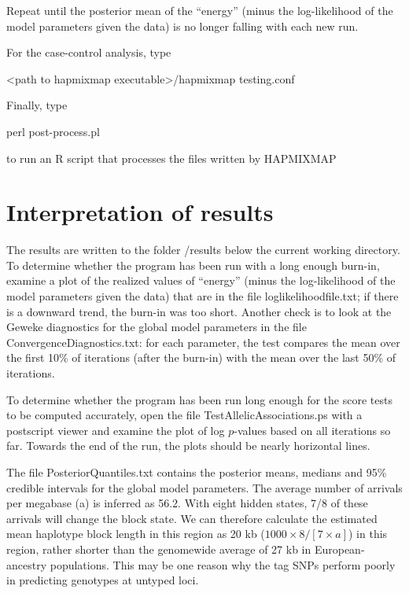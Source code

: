 \documentclass[preprint, a4paper]{aastex}
\begin{document}
Repeat  until  the  posterior   mean  of  the  ``energy''  (minus  the
log-likelihood of the model parameters given the data) is no longer falling
with each new run.  

For the case-control analysis, type 

<path to hapmixmap executable>/hapmixmap testing.conf

Finally, type 

perl post-process.pl

to run an R script that processes the files written by HAPMIXMAP


\section{Interpretation of results}
The results are written to the folder /results below the current
working directory.  To determine whether the program has been run with
a long enough burn-in, examine a plot of the realized values of
``energy'' (minus the log-likelihood of the model parameters given the
data) that are in the file loglikelihoodfile.txt; if there is a
downward trend, the burn-in was too short.  Another check is to look
at the Geweke diagnostics for the global model parameters in the file
ConvergenceDiagnostics.txt: for each parameter, the test compares the
mean over the first 10\% of iterations (after the burn-in) with the
mean over the last 50\% of iterations.

To determine whether the program has been run long enough for the
score tests to be computed accurately, open the file
TestAllelicAssociations.ps with a postscript viewer and examine the
plot of log $p$-values based on all iterations so far.  Towards the
end of the run, the plots should be nearly horizontal lines.

The file PosteriorQuantiles.txt contains the posterior means, medians
and 95\% credible intervals for the global model parameters.  The
average number of arrivals per megabase (a) is inferred as 56.2.  With
eight hidden states, 7/8 of these arrivals will change the block
state.  We can therefore calculate the estimated mean haplotype block
length in this region as 20 kb ($1000 \times 8 / \left[ 7 \times a \right]$) in this
region, rather shorter than the genomewide average of 27 kb in
European-ancestry  populations.  This may  be one  reason why  the tag
SNPs perform poorly in predicting genotypes at untyped loci.  
\end{document}
